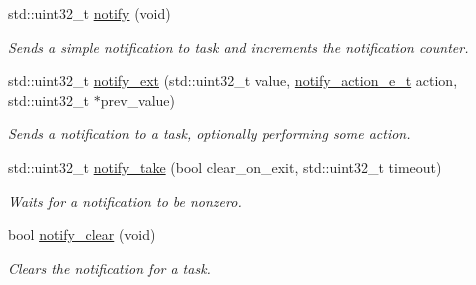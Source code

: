 \begin{DoxyCompactItemize}
std\+::uint32\+\_\+t \mbox{\hyperlink{classpros_1_1Task_ad376e3065701ba4853d4be1c90c0544c}{notify}} (void)
\begin{DoxyCompactList}\small\item\em Sends a simple notification to task and increments the notification counter. \end{DoxyCompactList}\item 
std\+::uint32\+\_\+t \mbox{\hyperlink{classpros_1_1Task_add5bc6272aaa903fdf8ae6656d8ffddb}{notify\+\_\+ext}} (std\+::uint32\+\_\+t value, \mbox{\hyperlink{rtos_8h_a42ea99b5e5d38da0b98154609cf6c570}{notify\+\_\+action\+\_\+e\+\_\+t}} action, std\+::uint32\+\_\+t $\ast$prev\+\_\+value)
\begin{DoxyCompactList}\small\item\em Sends a notification to a task, optionally performing some action. \end{DoxyCompactList}\item 
std\+::uint32\+\_\+t \mbox{\hyperlink{classpros_1_1Task_ab0424664979128a156fbcd2533a75da2}{notify\+\_\+take}} (bool clear\+\_\+on\+\_\+exit, std\+::uint32\+\_\+t timeout)
\begin{DoxyCompactList}\small\item\em Waits for a notification to be nonzero. \end{DoxyCompactList}\item 
bool \mbox{\hyperlink{classpros_1_1Task_a6fc6c97f2dd9fc92b6b9ff47557f215f}{notify\+\_\+clear}} (void)
\begin{DoxyCompactList}\small\item\em Clears the notification for a task. \end{DoxyCompactList}\end{DoxyCompactItemize}
